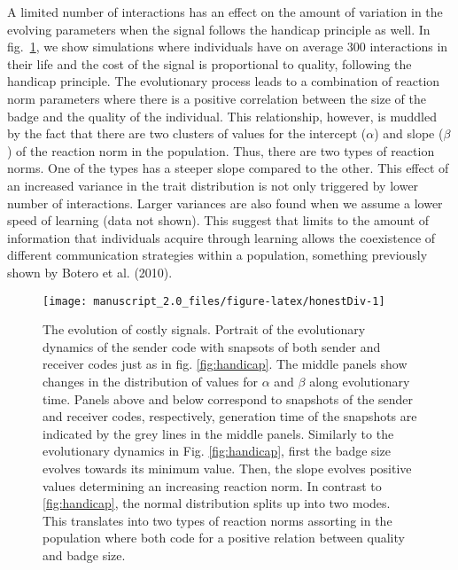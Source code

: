 \documentclass[
  12pt,
]{article}
\providecommand{\DIFaddtex}[1]{{\protect\color{blue}\uwave{#1}}} %
\providecommand{\DIFaddbegin}{} %
\providecommand{\DIFaddend}{} %
\providecommand{\DIFaddbeginFL}{} %
\providecommand{\DIFaddendFL}{} %
\providecommand{\DIFdelbeginFL}{} %
\providecommand{\DIFdelendFL}{} %
\providecommand{\DIFadd}[1]{\texorpdfstring{\DIFaddtex{#1}}{#1}} %
\newcommand{\DIFscaledelfig}{0.5}
\newlength{\DIFdelgraphicswidth} %
\newlength{\DIFdelgraphicsheight} %
\newcommand{\DIFaddincludegraphics}[2][]{{\color{blue}\fbox{\DIFOincludegraphics[#1]{#2}}}} %
\newcommand{\DIFdelincludegraphics}[2][]{%
\sbox{\DIFdelgraphicsbox}{\DIFOincludegraphics[#1]{#2}}%
\settoboxwidth{\DIFdelgraphicswidth}{\DIFdelgraphicsbox} %
\settoboxtotalheight{\DIFdelgraphicsheight}{\DIFdelgraphicsbox} %
\scalebox{\DIFscaledelfig}{%
\parbox[b]{\DIFdelgraphicswidth}{\usebox{\DIFdelgraphicsbox}\\[-\baselineskip] \rule{\DIFdelgraphicswidth}{0em}}\llap{\resizebox{\DIFdelgraphicswidth}{\DIFdelgraphicsheight}{%
\setlength{\unitlength}{\DIFdelgraphicswidth}%
\begin{picture}(1,1)%
\thicklines\linethickness{2pt} %
{\color[rgb]{1,0,0}\put(0,0){\framebox(1,1){}}}%
{\color[rgb]{1,0,0}\put(0,0){\line( 1,1){1}}}%
{\color[rgb]{1,0,0}\put(0,1){\line(1,-1){1}}}%
\end{picture}%
}\hspace*{3pt}}} %
} %
\DeclareRobustCommand{\DIFaddbegin}{\DIFOaddbegin \let\includegraphics\DIFaddincludegraphics} %
\DeclareRobustCommand{\DIFaddend}{\DIFOaddend \let\includegraphics\DIFOincludegraphics} %
\DeclareRobustCommand{\DIFaddbeginFL}{\DIFOaddbeginFL \let\includegraphics\DIFaddincludegraphics} %
\DeclareRobustCommand{\DIFaddendFL}{\DIFOaddendFL \let\includegraphics\DIFOincludegraphics} %
\DeclareRobustCommand{\DIFdelbeginFL}{\DIFOdelbeginFL \let\includegraphics\DIFdelincludegraphics} %
\DeclareRobustCommand{\DIFdelendFL}{\DIFOaddendFL \let\includegraphics\DIFOincludegraphics} %
\begin{document}
A limited number of interactions has an effect on the amount of
variation in the evolving parameters when the signal follows the
handicap principle as well. In fig.~\ref{fig:honestDiv}, we show
simulations where individuals have on average 300 interactions in their
life and the cost of the signal is proportional to quality, following
the handicap principle. The evolutionary process leads to a combination
of reaction norm parameters where there is a positive correlation
between the size of the badge and the quality of the individual. This
relationship, however, is muddled by the fact that there are two
clusters of values for the \DIFaddbegin \DIFadd{logistic }\DIFaddend intercept (\(\alpha\)) and slope
(\(\beta\)) of the reaction norm in the population. Thus, there are two
types of reaction norms. One of the types has a steeper slope compared
to the other. This effect of an increased variance in the trait
distribution is not only triggered by lower number of interactions.
Larger variances are also found when we assume a lower speed of learning
(data not shown). This suggest that limits to the amount of information
that individuals acquire through learning allows the coexistence of
different communication strategies within a population, something
previously shown by Botero et al. (2010).

\begin{figure}

{\centering \DIFdelbeginFL %
\DIFdelendFL \DIFaddbeginFL \texttt{[image: manuscript\_2.0\_files/figure-latex/honestDiv-1]} 

\DIFaddendFL 

}

\caption{The evolution of costly signals. Portrait of the evolutionary dynamics of the sender code with snapsots of both sender and receiver codes just as in fig. \ref{fig:handicap}. The middle panels show changes in the distribution of values for $\alpha$ and $\beta$ along evolutionary time. Panels above and below correspond to snapshots of the sender and receiver codes, respectively, generation time of the snapshots are indicated by the grey lines in the middle panels. Similarly to the evolutionary dynamics in Fig. \ref{fig:handicap}, first the badge size evolves towards its minimum value. Then, the slope evolves positive values determining an increasing reaction norm. In contrast to \ref{fig:handicap}, the normal distribution splits up into two modes. This translates into two types of reaction norms assorting in the population where both code for a positive relation between quality and badge size.}\label{fig:honestDiv}
\end{figure}
\end{document}
